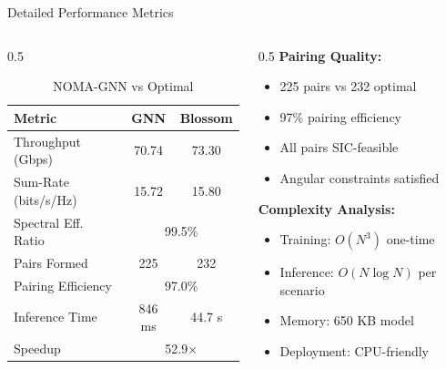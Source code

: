 \documentclass[aspectratio=169]{beamer}
\begin{document}
\begin{frame}{Detailed Performance Metrics}
    \begin{columns}
        \begin{column}{0.5\textwidth}
            \begin{table}
                \centering
                \small
                \begin{tabular}{lcc}
                    \toprule
                    \textbf{Metric} & \textbf{GNN} & \textbf{Blossom} \\
                    \midrule
                    Throughput (Gbps) & 70.74 & 73.30 \\
                    Sum-Rate (bits/s/Hz) & 15.72 & 15.80 \\
                    Spectral Eff. Ratio & \multicolumn{2}{c}{99.5\%} \\
                    \midrule
                    Pairs Formed & 225 & 232 \\
                    Pairing Efficiency & \multicolumn{2}{c}{97.0\%} \\
                    \midrule
                    Inference Time & 846 ms & 44.7 s \\
                    Speedup & \multicolumn{2}{c}{52.9×} \\
                    \bottomrule
                \end{tabular}
                \caption{NOMA-GNN vs Optimal}
            \end{table}
        \end{column}
        \begin{column}{0.5\textwidth}
            \textbf{Pairing Quality:}
            \begin{itemize}
                \item 225 pairs vs 232 optimal
                \item 97\% pairing efficiency
                \item All pairs SIC-feasible
                \item Angular constraints satisfied
            \end{itemize}
            
            \vspace{0.3cm}
            
            \textbf{Complexity Analysis:}
            \begin{itemize}
                \item Training: $O(N^3)$ one-time
                \item Inference: $O(N \log N)$ per scenario
                \item Memory: 650 KB model
                \item Deployment: CPU-friendly
            \end{itemize}
        \end{column}
    \end{columns}
    

\end{frame}
\end{document}

